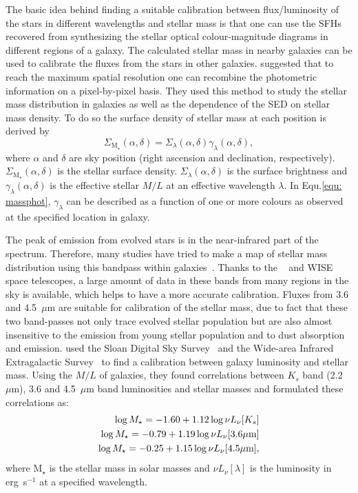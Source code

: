 The basic idea behind finding a suitable calibration between flux/luminosity of the stars in different wavelengths and stellar mass is that one can use the SFHs recovered from synthesizing the stellar optical colour-magnitude diagrams in different regions of a galaxy. 
The calculated stellar mass in nearby galaxies can be used to calibrate the fluxes from the stars in other galaxies.
\cite{Zibetti09} suggested that to reach the maximum spatial resolution one can recombine the photometric information on a pixel-by-pixel basis. 
They used this method to study the stellar mass distribution in galaxies as well as the dependence of the SED on stellar mass density.
To do so the surface density of stellar mass at each position is derived by 
\begin{equation}
\label{equ: massphot}
\Sigma_{{\mathrm M_\star}} (\alpha, \delta) = \Sigma_{\lambda}(\alpha, \delta) \gamma_{\lambda}(\alpha, \delta),
\end{equation}
where $\alpha$ and $\delta$ are sky position (right ascension and declination, respectively).
$\Sigma_{{\mathrm M_\star}} (\alpha, \delta)$ is the stellar surface density.
$\Sigma_{\lambda}(\alpha, \delta)$ is the surface brightness and $\gamma_{\lambda}(\alpha, \delta)$ is the effective stellar $M/L$ at an effective wavelength $\lambda$.
In Equ.\ref{equ: massphot},  $\gamma_{\lambda}$ can be described as a function of one or more colours as observed at the specified location in galaxy. 

The peak of emission from evolved stars is in the near-infrared part of the spectrum.
Therefore, many studies have tried to make a map of stellar mass distribution using this bandpass within galaxies~\citep[e.g.,][]{Elmgreen84}.
Thanks to the \Spitzer~\citep{Wener04} and WISE~\citep{Wright10} space telescopes, a large amount of data in these bands from many regions in the sky is available, which helps to have a more accurate calibration. 
Fluxes from 3.6 and 4.5~$\mu$m are suitable for calibration of the stellar mass, due to fact that these two band-passes not only trace evolved stellar population but are also almost insensitive to the emission from young stellar population and to dust absorption and emission. 
\cite{Zhu10} used the Sloan Digital Sky Survey~\citep[SDSS][]{York00} and the \Spitzer Wide-area Infrared Extragalactic Survey~\citep[SWIRE;][]{Lonsdale03} to find a calibration between galaxy luminosity and stellar mass. 
Using the $M/L$ of galaxies, they found correlations between $K_s$ band (2.2~$\mu$m), 3.6 and 4.5~$\mu$m band luminosities and stellar masses and formulated these correlations as:
\begin{align} %
\label{equ: zhu1}
\log M_{\star} = -1.60  + 1.12  \log \nu L_{\nu}[K_s]\\
\log M_{\star} = -0.79 + 1.19 \log \nu L_{\nu}[3.6\mu \rm m]\\
\label{equ: zhu3}
\log M_{\star} = -0.25 + 1.15\log \nu L_{\nu}[4.5\mu \rm m], 
\end{align}
where M$_{\star}$ is the stellar mass in solar masses and $ \nu L_{\nu}[\lambda]$ is the luminosity in erg~s$^{-1}$ at a specified wavelength.

